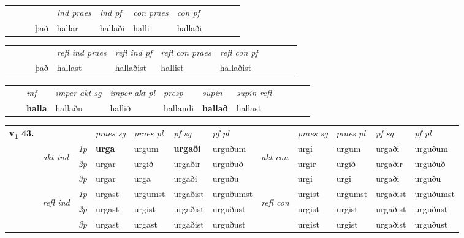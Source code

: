 \begin{tabular}{llllllllllll}
 & &  & &  \textit{ind praes} & \textit{ind pf} & \textit{con praes} & \textit{con pf} \\*
&  & & það & hallar & hallaði & halli & hallaði \\*
\cmidrule{5-9}
\end{tabular}


\begin{tabular}{llllllllllll}
 & &  & &  \textit{refl ind praes} & \textit{refl ind pf} & \textit{refl con praes} & \textit{refl con pf} \\*
 & &  & það & hallast & hallaðist & hallist & hallaðist \\*
\cmidrule{5-9}
\end{tabular}


\begin{tabular}{llllllllllll}
 & & \textit{inf} & \textit{imper akt sg} & \textit{imper akt pl}   & \textit{presp} & \textit{supin} & \textit{supin refl}      \\*
  & & \textbf{halla} & hallaðu  & hallið   & hallandi &  \textbf{hallað} & hallast  \\*
\cmidrule{1-12}
\end{tabular}



\begin{tabular}{llllllllllll} \toprule
\multirow{4}{*}{{{\textbf{v{\textsubscript{1}}} \Large{\textbf{43.}}}}}  & &   &  \textit{praes sg}  & \textit{praes pl}  &\textit{ pf sg} & \textit{pf pl} &  &  \textit{praes sg}  & \textit{praes pl}  & \textit{pf sg} & \textit{pf pl } \\*
	\cmidrule{4-7} \cmidrule{9-12}
 & \multirow{3}{*}{\begin{turn}{90}\textit{akt ind}\end{turn}} & {\textit{1p}} & \textbf{urga} & urgum    & \textbf{urgaði} & urguðum & \multirow{3}{*}{\begin{turn}{90}\textit{akt con}\end{turn}} &urgi & urgum & urgaði & urguðum\\*
& &  {\textit{2p}} &  urgar  & urgið   & urgaðir & urguðuð & & urgir & urgið & urgaðir & urguðuð \\*
& &  {\textit{3p}} & urgar & urga   & urgaði & urguðu & & urgi & urgi& urgaði & urguðu  \\*
\cmidrule{4-7} \cmidrule{9-12}
 &\multirow{3}{*}{\begin{turn}{90}\textit{refl ind}\end{turn}} & {\textit{1p}} & urgast & urgumst    & urgaðist & urguðumst & \multirow{3}{*}{\begin{turn}{90}\textit{refl con}\end{turn}}  &urgist & urgumst & urgaðist & urguðumst\\*
 &&  {\textit{2p}} &  urgast  & urgist   & urgaðist & urguðust & &urgist & urgist & urgaðist & urguðust \\*
& &  {\textit{3p}} & urgast & urgast   & urgaðist & urguðust & & urgist & urgist& urgaðist & urguðust  \\*
\cmidrule{4-7} \cmidrule{9-12}
\end{tabular}



